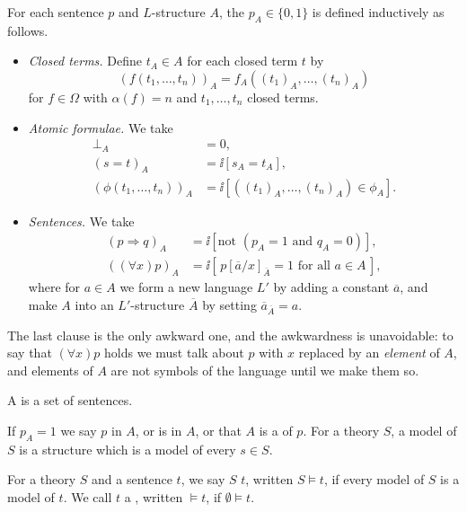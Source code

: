 \begin{definition}[Interpretation]
  For each sentence $p$ and $L$-structure $A$, the  $p_A \in \{0, 1\}$ is defined inductively as follows.
  \begin{itemize}
    \item \emph{Closed terms.} Define $t_A \in A$ for each closed term $t$ by
    $$
    (f(t_1, \dots, t_n))_A = f_A((t_1)_A, \dots, (t_n)_A)
    $$
    for $f \in \Omega$ with $\alpha(f) = n$ and $t_1, \dots, t_n$ closed terms.
    \item \emph{Atomic formulae.} We take
    \begin{align*}
      \bot_A &= 0,\\
      (s = t)_A &= \ii[s_A = t_A],\\
      (\phi(t_1, \dots, t_n))_A &= \ii[((t_1)_A, \dots, (t_n)_A) \in \phi_A].
    \end{align*}
    \item \emph{Sentences.} We take
    \begin{align*}
      (p \Rightarrow q)_A &= \ii[\text{not } (p_A = 1 \text{ and } q_A = 0)], \\
      ((\forall x)p)_A &= \ii[\,p[\overline{a}/x]_{\overline{A}} = 1 \text{ for all } a\in A\,],
    \end{align*}
    where for $a \in A$ we form a new language $L'$ by adding a constant $\overline{a}$, and make $A$ into an $L'$-structure $\overline{A}$ by setting $\overline{a}_{\overline{A}} = a$.
  \end{itemize}
\end{definition}

The last clause is the only awkward one, and the awkwardness is unavoidable: to say that $(\forall x) p$ holds we must talk about $p$ with $x$ replaced by an \emph{element} of $A$, and elements of $A$ are not symbols of the language until we make them so.

\begin{definition}[Theory]
  A  is a set of sentences.
\end{definition}

\begin{definition}[Model]
  If $p_A = 1$ we say $p$  in $A$, or is  in $A$, or that $A$ is a  of $p$. For a theory $S$, a model of $S$ is a structure which is a model of every $s \in S$.
\end{definition}

\begin{definition}
  For a theory $S$ and a sentence $t$, we say $S$  $t$, written $S \models t$, if every model of $S$ is a model of $t$. We call $t$ a , written $\models t$, if $\emptyset \models t$.
\end{definition}

